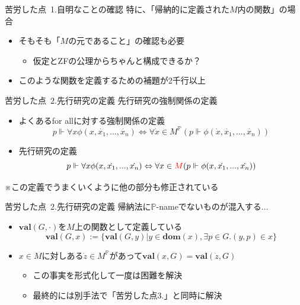 \documentclass[17pt,aspectratio=169]{beamer}
\newcommand{\Pbb}{\mathbb{P}}
\begin{document}
\begin{frame}{苦労した点\, {\normalsize 1.自明なことの確認}}
    特に、「帰納的に定義された$M$内の関数」の場合

    {\small
    \begin{itemize}
        \item そもそも「$M$の元であること」の確認も必要
              {\footnotesize
              \begin{itemize}
                  \item 仮定とZFの公理からちゃんと構成できるか？
              \end{itemize}}
        \item このような関数を定義するための補題が2千行以上
    \end{itemize}
    }
\end{frame}

\begin{frame}{苦労した点\, {\normalsize 2.先行研究の定義}}
    先行研究の強制関係の定義
    {\small
    \begin{itemize}[itemsep=8pt]
        \item よくあるfor allに対する強制関係の定義
              $$ p \Vdash \forall x \phi(x, \dot{x_1}, ..., \dot{x_n}) \Leftrightarrow \forall \dot{x} \in M^\Pbb(p \Vdash \phi(\dot{x}, \dot{x_1}, ..., \dot{x_n})) $$
        \item 先行研究の定義
              $$ p \Vdash \forall x \phi(x, \dot{x_1}, ..., \dot{x_n}) \Leftrightarrow \forall x \in \textcolor{red}{M}(p \Vdash \phi(x, \dot{x_1}, ..., \dot{x_n})) $$
    \end{itemize}
    \vspace{-6pt}
    \hspace{1cm}※この定義でうまくいくように他の部分も修正されている
    }
\end{frame}

\begin{frame}{苦労した点\, {\normalsize 2.先行研究の定義}}
    帰納法に$\Pbb$-nameでないものが混入する...
    {
    \small
    \begin{itemize}[itemsep=8pt]
        \item $\mathbf{val}(G, \cdot)$を$M$上の関数として定義している
              $$\mathbf{val}(G, x) := \{ \mathbf{val}(G, y) | y \in \mathbf{dom}(x), \exists p \in G. (y, p) \in x \}$$
        \item $x \in M$に対しある$\dot{z} \in M^\Pbb$があって$\mathbf{val}(x, G) = \mathbf{val}(\dot{z}, G)$
              \vspace{5pt}
              \begin{itemize}
                  \item この事実を形式化して一度は困難を解決
                  \item 最終的には別手法で「苦労した点3.」と同時に解決
              \end{itemize}
    \end{itemize}

    }
\end{frame}
\end{document}
